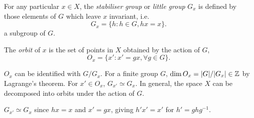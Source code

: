 \documentclass[a4paper,11pt]{article}
\begin{document}
	\begin{defi}
		For any particular $x \in X$, the \emph{stabiliser group} or \emph{little group} $G_x$ is defined by those elements of $G$ which leave $x$ invariant, i.e.\ 
		\[
			G_x = \{h : h\in G, h x = x\}.
		\]
		a subgroup of $G$.
	\end{defi}

	\begin{defi}
		The \emph{orbit} of $x$ is the set of points in $X$ obtained by the action of $G$, 
		\[
			O_x = \{x' : x' = g x, \forall g \in G\}.
		\]
	\end{defi}

	\begin{thm}
		$O_x$ can be identified with $G / G_x$. For a finite group $G$, $\dim O_x = \abs{G}/\abs{G_x} \in \mathbb{Z}$ by Lagrange's theorem. For $x' \in O_x$, $G_{x'} \simeq G_x$. In general, the space $X$ can be decomposed into orbits under the action of $G$.
	\end{thm}

	\begin{hint}
		$G_{x'} \simeq G_x$ since $hx = x$ and $x' = gx$, giving $h'x' = x'$ for $h' = ghg^{-1}$. 
	\end{hint}
	
\end{document}
